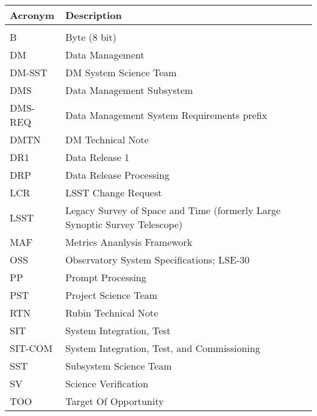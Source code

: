 \addtocounter{table}{-1}
\begin{longtable}{p{}p{}}\hline
\textbf{Acronym} & \textbf{Description}  \\\hline

 &  \\\hline
B & Byte (8 bit) \\\hline
DM & Data Management \\\hline
DM-SST & DM System Science Team \\\hline
DMS & Data Management Subsystem \\\hline
DMS-REQ & Data Management System Requirements prefix \\\hline
DMTN & DM Technical Note \\\hline
DR1 & Data Release 1 \\\hline
DRP & Data Release Processing \\\hline
LCR & LSST Change Request \\\hline
LSST & Legacy Survey of Space and Time (formerly Large Synoptic Survey Telescope) \\\hline
MAF & Metrics Ananlysis Framework \\\hline
OSS & Observatory System Specifications; LSE-30 \\\hline
PP & Prompt Processing \\\hline
PST & Project Science Team \\\hline
RTN & Rubin Technical Note \\\hline
SIT & System Integration, Test \\\hline
SIT-COM & System Integration, Test, and Commissioning \\\hline
SST & Subsystem Science Team \\\hline
SV & Science Verification \\\hline
TOO & Target Of Opportunity \\\hline
\end{longtable}
